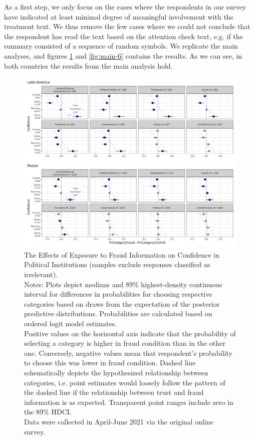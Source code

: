 \documentclass[11pt, ngerman,english,a4]{article}
\begin{document}
As a first step, we only focus on the cases where the respondents in our survey have indicated at least minimal degree of meaningful involvement with the treatment text. We thus remove the few cases where we could not conclude that the respondent has read the text based on the attention check text, e.g. if the summary consisted of a sequence of random symbols. We replicate the main analyses, and figures \ref{fig:main-2} and \ref{fig:main-6} contains the results. As we can see, in both countries the results from the main analysis hold. 

\begin{figure}[H]
	\centering
	\includegraphics[width=\linewidth,trim=4 4 4 4,clip]{figs/main_hdi89_2.png}
	\caption{The Effects of Exposure to Fraud Information on Confidence in Political Institutions (samples exclude responses classified as irrelevant).  \\
		\footnotesize{Notes: Plots depict medians and 89\% highest-density continuous interval for differences in probabilities for choosing respective categories based on draws from the expectation of the posterior predictive distributions. Probabilities are calculated based on ordered logit model estimates.\\
			Positive values on the horizontal axis indicate that the probability of selecting a category is higher in fraud condition than in the other one. Conversely, negative values mean that respondent's probability to choose this was lower in fraud condition. Dashed line schematically depicts the hypothesized relationship between categories, i.e. point estimates would loosely follow the pattern of the dashed line if the relationship between trust and fraud information is as expected. Transparent point ranges include zero in the 89\% HDCI.\\
	Data were collected in April-June 2021 via the original online survey. } }
	\singlespacing
	\raggedright
	\label{fig:main-2}
\end{figure}
    
\end{document}
